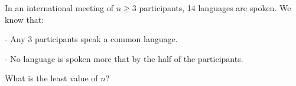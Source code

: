 In an international meeting of $n \geq 3$ participants, 14 languages are spoken. We know that:

- Any 3 participants speak a common language.

- No language is spoken more that by the half of the participants.

What is the least value of $n$?